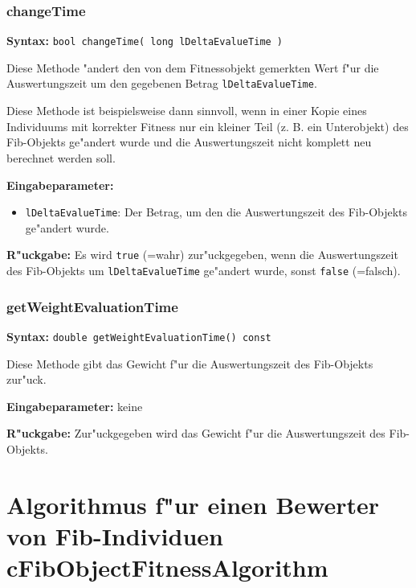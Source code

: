 \subsubsection{changeTime}

\textbf{Syntax:} \verb|bool changeTime( long lDeltaEvalueTime )|

\bigskip\noindent
Diese Methode "andert den von dem Fitnessobjekt gemerkten Wert f"ur die Auswertungszeit um den gegebenen Betrag \verb|lDeltaEvalueTime|.

Diese Methode ist beispielsweise dann sinnvoll, wenn in einer Kopie eines Individuums mit korrekter Fitness nur ein kleiner Teil (z. B. ein Unterobjekt) des Fib-Objekts ge"andert wurde und die Auswertungszeit nicht komplett neu berechnet werden soll.

\bigskip\noindent
\textbf{Eingabeparameter:}
\begin{itemize}
 \item \verb|lDeltaEvalueTime|: Der Betrag, um den die Auswertungszeit des Fib-Objekts ge"andert wurde.
\end{itemize}

\bigskip\noindent
\textbf{R"uckgabe:} Es wird \verb|true| (=wahr) zur"uckgegeben, wenn die Auswertungszeit des Fib-Objekts um \verb|lDeltaEvalueTime| ge"andert wurde, sonst \verb|false| (=falsch).


\subsubsection{getWeightEvaluationTime}

\textbf{Syntax:} \verb|double getWeightEvaluationTime() const|

\bigskip\noindent
Diese Methode gibt das Gewicht f"ur die Auswertungszeit des Fib-Objekts zur"uck.

\bigskip\noindent
\textbf{Eingabeparameter:} keine

\bigskip\noindent
\textbf{R"uckgabe:} Zur"uckgegeben wird das Gewicht f"ur die Auswertungszeit des Fib-Objekts.


\section{Algorithmus f"ur einen Bewerter von Fib-Individuen cFibObjectFitnessAlgorithm}
\label{secCFibObjectFitnessAlgorithmus}

